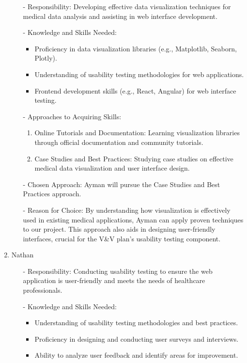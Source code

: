 \documentclass[12pt, titlepage]{article}
\begin{document}
\begin{enumerate}
  \begin{itemize}
      \item[-] Responsibility: Developing effective data visualization techniques for medical data analysis and assisting in web interface development.
      \item[-] Knowledge and Skills Needed:
      \begin{itemize}
          \item Proficiency in data visualization libraries (e.g., Matplotlib, Seaborn, Plotly).
          \item Understanding of usability testing methodologies for web applications.
          \item Frontend development skills (e.g., React, Angular) for web interface testing.
      \end{itemize}
      \item[-] Approaches to Acquiring Skills:
      \begin{enumerate}
          \item Online Tutorials and Documentation: Learning visualization libraries through official documentation and community tutorials.
          \item Case Studies and Best Practices: Studying case studies on effective medical data visualization and user interface design.
      \end{enumerate}
      \item[-] Chosen Approach: Ayman will pursue the Case Studies and Best Practices approach.
      \item[-] Reason for Choice: By understanding how visualization is effectively used in existing medical applications, Ayman can apply proven techniques to our project. This approach also aids in designing user-friendly interfaces, crucial for the V\&V plan's usability testing component.
  \end{itemize}

  \item Nathan 

  \begin{itemize}
      \item[-] Responsibility: Conducting usability testing to ensure the web application is user-friendly and meets the needs of healthcare professionals.
      
      \item[-]Knowledge and Skills Needed:
      \begin{itemize}
          \item Understanding of usability testing methodologies and best practices.
          \item Proficiency in designing and conducting user surveys and interviews.
          \item Ability to analyze user feedback and identify areas for improvement.
      \end{itemize}
      

\end{itemize}
\end{enumerate}
\end{document}
